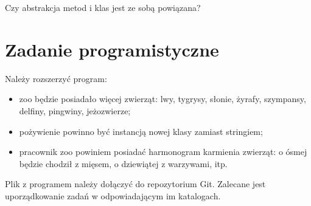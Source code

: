 \documentclass{article}
\begin{document}
	Czy abstrakcja metod i klas jest ze sobą powiązana?

	\section{Zadanie programistyczne}
	Należy rozszerzyć program:
	
	\begin{itemize}
		\item zoo będzie posiadało więcej zwierząt: lwy, tygrysy, słonie, żyrafy, szympansy, delfiny, pingwiny, jeżozwierze;
		\item pożywienie powinno być instancją nowej klasy zamiast stringiem;
		\item pracownik zoo powiniem posiadać harmonogram karmienia zwierząt: o ósmej będzie chodził z mięsem, o dziewiątej z warzywami, itp.
	\end{itemize}
	
	Plik z programem należy dołączyć do repozytorium Git. Zalecane jest uporządkowanie zadań w odpowiadającym im katalogach.
\end{document}
